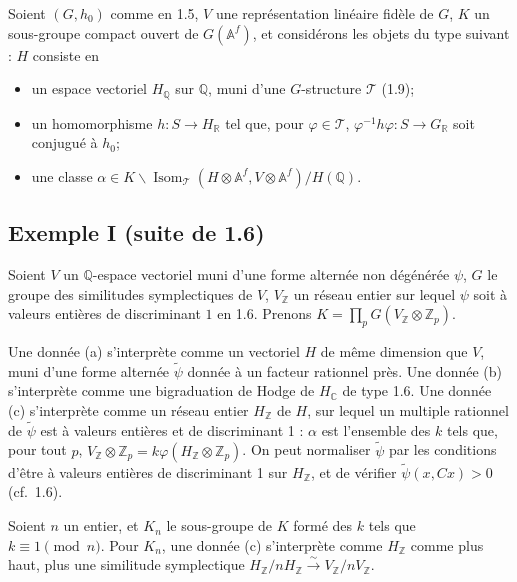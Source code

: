\documentclass[11pt]{amsart}
\theoremstyle{plain}
\theoremstyle{definition}
\DeclareMathOperator{\Isom}{Isom}
\newcommand{\ZZ}{\mathbb{Z}}
\newcommand{\QQ}{\mathbb{Q}}
\newcommand{\RR}{\mathbb{R}}
\newcommand{\CC}{\mathbb{C}}
\newcommand{\AAf}{\mathbb{A}^f}
\begin{document}
Soient $(G,h_0)$ comme en 1.5, $V$ une repr\'esentation lin\'eaire fid\`ele de $G$, $K$ un sous-groupe compact ouvert de $G(\AAf)$, et consid\'erons les objets du type suivant : $H$ consiste en

\begin{itemize}
\item[(a)] un espace vectoriel $H_{\QQ}$ sur $\QQ$, muni d'une $G$-structure $\mathcal{T}$ (1.9);
\item[(b)] un homomorphisme $h : S \to H_{\RR}$ tel que, pour $\varphi \in \mathcal{T}$, $\varphi^{-1} h \varphi : S \to G_{\RR}$ soit conjugu\'e \`a $h_0$;
\item[(c)] une classe $\alpha \in K \backslash \Isom_{\mathcal{T}}(H \otimes \AAf, V \otimes \AAf)/H(\QQ)$.
\end{itemize}

\subsection{Exemple I (suite de 1.6)}

Soient $V$ un $\QQ$-espace vectoriel muni d'une forme altern\'ee non d\'eg\'en\'er\'ee $\psi$, $G$ le groupe des similitudes symplectiques de $V$, $V_{\ZZ}$ un r\'eseau entier sur lequel $\psi$ soit \`a valeurs enti\`eres de discriminant $1$ en 1.6. Prenons $K = \prod_p G(V_{\ZZ} \otimes \ZZ_p)$.

Une donn\'ee (a) s'interpr\`ete comme un vectoriel $H$ de m\^eme dimension que $V$, muni d'une forme altern\'ee $\tilde{\psi}$ donn\'ee \`a un facteur rationnel pr\`es. Une donn\'ee (b) s'interpr\`ete comme une bigraduation de Hodge de $H_{\CC}$ de type 1.6. Une donn\'ee (c) s'interpr\`ete comme un r\'eseau entier $H_{\ZZ}$ de $H$, sur lequel un multiple rationnel de $\tilde{\psi}$ est \`a valeurs enti\`eres et de discriminant 1 : $\alpha$ est l'ensemble des $k$ tels que, pour tout $p$, $V_{\ZZ} \otimes \ZZ_p = k\varphi(H_{\ZZ} \otimes \ZZ_p)$. On peut normaliser $\tilde{\psi}$ par les conditions d'\^etre \`a valeurs enti\`eres de discriminant 1 sur $H_{\ZZ}$, et de v\'erifier $\tilde{\psi}(x, Cx) > 0$ (cf.\ 1.6).

Soient $n$ un entier, et $K_n$ le sous-groupe de $K$ form\'e des $k$ tels que $k \equiv 1 \pmod n$. Pour $K_n$, une donn\'ee (c) s'interpr\`ete comme $H_{\ZZ}$ comme plus haut, plus une similitude symplectique $H_{\ZZ}/nH_{\ZZ} \xrightarrow{\sim} V_{\ZZ}/nV_{\ZZ}$.

\subsection{}
\end{document}
